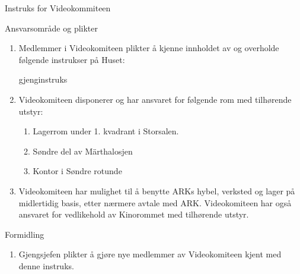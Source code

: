 \begin{instruks}{Instruks for Videokommiteen}{ }{ }
     \begin{instruksledd}{Ansvarsområde og plikter}
        \begin{enumerate}
           \item Medlemmer i Videokomiteen plikter å kjenne innholdet av og overholde følgende
                instrukser på Huset:
                \begin{enumerate} 
                    \itemGenerell gjenginstruks
                \end{enumerate}
            \item Videokomiteen disponerer og har ansvaret for følgende rom med tilhørende utstyr:
                \begin{enumerate}
                    \item Lagerrom under 1. kvadrant i Storsalen.
                    \item Søndre del av Märthalosjen
                    \item Kontor i Søndre rotunde
                \end{enumerate}
            \item Videokomiteen har mulighet til å benytte ARKs hybel, verksted og lager på midlertidig
            basis, etter nærmere
            avtale med ARK. Videokomiteen har også ansvaret for vedlikehold av Kinorommet med
            tilhørende utstyr.
        \end{enumerate}
    \end{instruksledd}

    \begin{instruksledd}{Formidling}
        \begin{enumerate}
            \item Gjengsjefen plikter å gjøre nye medlemmer av Videokomiteen kjent med
                denne instruks.
        \end{enumerate}
    \end{instruksledd}


 \end{instruks}

